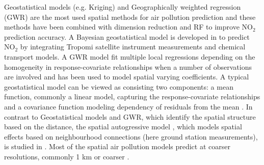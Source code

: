 \documentclass{article}
\begin{document}
Geostatistical models (e.g. Kriging) and Geographically weighted regression (GWR) are the most used spatial methods for air pollution prediction \citep{vicedo2013bayesian,li2014estimating,wang2021impacts,zou2016high} and these methods have been combined with dimension reduction \cite{zhai2018improved} and RF \citep{zhan2018satellite,liu2020integrate} to improve NO$_2$ prediction accuracy. A Bayesian geostatistical model is developed in \cite{BELOCONI2020105578} to predict NO$_2$ by integrating Tropomi satellite instrument measurements and chemical transport models. A GWR model fit multiple local regressions depending on the homogeneity in response-covariate relationships when a number of observations are involved and has been used to model spatial varying coefficients. A typical geostatistical model can be viewed as consisting two components: a mean function, commonly a linear model, capturing the response-covariate relationships and a covariance function modeling dependency of residuals from the mean \citep{stackinla}. In contrast to Geostatistical models and GWR, which identify the spatial structure based on the distance, the spatial autogressive model \citep{anselin2001spatial}, which models spatial effects based on neighbourhood connections (here ground station measurements), is studied in \cite{BERTAZZON20159}. Most of the spatial air pollution models predict at coarser resolutions, commonly 1 km or coarser \citep{young2016satellite,shaddick2018data,BELOCONI2020105578}.



\end{document}
